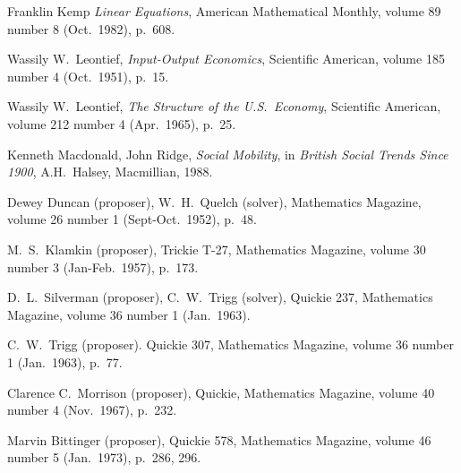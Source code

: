\begin{thebibliography}{\makebox[2em][c]{{}\hfil{}}}
  Franklin Kemp
  \emph{Linear Equations},
  American Mathematical Monthly,
  volume 89 number 8 (Oct.\ 1982),
  p.~608.



  Wassily W.\ Leontief,
  \emph{Input-Output Economics},
  Scientific American,
  volume 185 number 4 (Oct.\ 1951),
  p.~15. 

  Wassily W.\ Leontief,
  \emph{The Structure of the U.S.\ Economy},
  Scientific American,
  volume 212 number 4 (Apr.\ 1965),
  p.~25. 


  Kenneth Macdonald, John Ridge,
  \emph{Social Mobility},
  in \emph{British Social Trends Since 1900},
  A.H.~Halsey,
  Macmillian, 1988.


  Dewey Duncan (proposer), W.\ H.\ Quelch (solver),
  Mathematics Magazine,
  volume 26 number 1 (Sept-Oct.\ 1952),
  p.~48.

  M.\ S.\ Klamkin (proposer),
  Trickie T-27,
  Mathematics Magazine,
  volume 30 number 3 (Jan-Feb.\ 1957),
  p.~173.

  D.\ L.\ Silverman (proposer), C.\ W.\ Trigg (solver),
  Quickie 237,
  Mathematics Magazine,
  volume 36 number 1 (Jan.\ 1963).

  C.\ W.\ Trigg (proposer).
  Quickie 307,
  Mathematics Magazine,
  volume 36 number 1 (Jan.\ 1963),
  p.~77.

  Clarence C.\ Morrison (proposer),
  Quickie,
  Mathematics Magazine,
  volume 40 number 4 (Nov.\ 1967),
  p.~232.

  Marvin Bittinger (proposer),
  Quickie 578,
  Mathematics Magazine,
  volume 46 number 5 (Jan.\ 1973),
  p.~286, 296.


\end{thebibliography}
